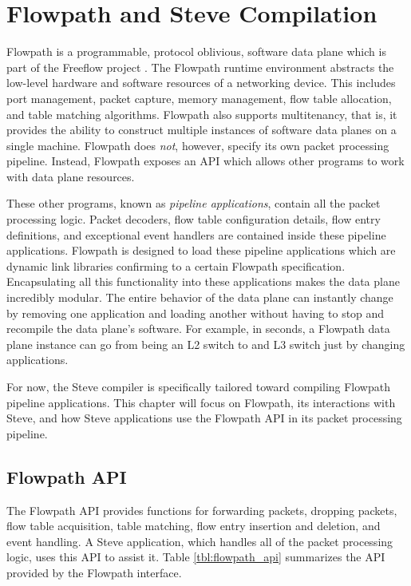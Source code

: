 \chapter{Flowpath and Steve Compilation} \label{ch:flowpath}

Flowpath is a programmable, protocol oblivious, software data plane which is part of the Freeflow project \cite{freeflow_software}. 
The Flowpath runtime environment abstracts the low-level hardware and software resources of a networking device. This includes port management, packet capture, memory management, flow table allocation, and table matching algorithms. Flowpath also supports multitenancy, that is, it provides the ability to construct multiple instances of software data planes on a single machine. Flowpath does \textit{not}, however, specify its own packet processing pipeline. Instead, Flowpath exposes an API which allows other programs to work with data plane resources. 

These other programs, known as \textit{pipeline applications}, contain all the packet processing logic. Packet decoders, flow table configuration details, flow entry definitions, and exceptional event handlers are contained inside these pipeline applications.
Flowpath is designed to load these pipeline applications which are dynamic link libraries confirming to a certain Flowpath specification. Encapsulating all this functionality into these applications makes the data plane incredibly modular. The entire behavior of the data plane can instantly change by removing one application and loading another without having to stop and recompile the data plane's software. For example, in seconds, a Flowpath data plane instance can go from being an L2 switch to and L3 switch just by changing applications. 

For now, the Steve compiler is specifically tailored toward compiling Flowpath pipeline applications. This chapter will focus on Flowpath, its interactions with Steve, and how Steve applications use the Flowpath API in its packet processing pipeline. 

\section{Flowpath API} \label{fp:dp_interface}

The Flowpath API provides functions for forwarding packets, dropping packets, flow table acquisition, table matching, flow entry insertion and deletion, and event handling. A Steve application, which handles all of the packet processing logic, uses this API to assist it. Table \ref{tbl:flowpath_api} summarizes the API provided by the Flowpath interface.


